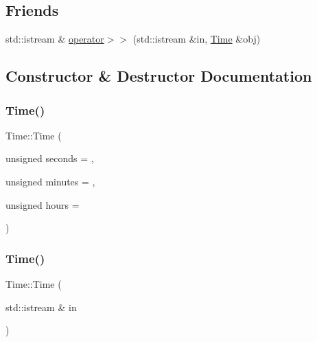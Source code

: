 \subsection*{Friends}
\begin{DoxyCompactItemize}
\item 
std\+::istream \& \hyperlink{classTime_ae4ac864187eab9a6a954dd4213ec49fa}{operator$>$$>$} (std\+::istream \&in, \hyperlink{classTime}{Time} \&obj)
\end{DoxyCompactItemize}


\subsection{Constructor \& Destructor Documentation}
\mbox{\label{classTime_a393f1af1f9496b8833e3207f99325167}} 
\subsubsection{\texorpdfstring{Time()}{Time()}\hspace{0.1cm}{\footnotesize\ttfamily [1/3]}}
{\footnotesize\ttfamily Time\+::\+Time (\begin{DoxyParamCaption}\item[{unsigned}]{seconds = {},  }\item[{unsigned}]{minutes = {},  }\item[{unsigned}]{hours = {} }\end{DoxyParamCaption})}

\mbox{\label{classTime_a85ec464631df4b1284f2e0d53f549750}} 
\subsubsection{\texorpdfstring{Time()}{Time()}\hspace{0.1cm}{\footnotesize\ttfamily [2/3]}}
{\footnotesize\ttfamily Time\+::\+Time (\begin{DoxyParamCaption}\item[{std\+::istream \&}]{in }\end{DoxyParamCaption})}

\mbox{\label{classTime_a9f96dc51f4ad6a98493ebc129b8f125a}} 
